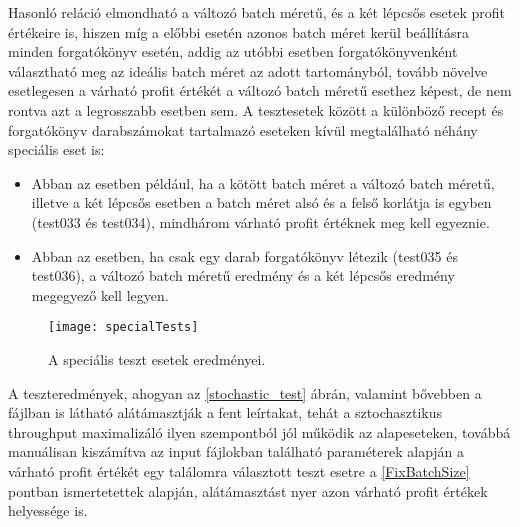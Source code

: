 Hasonló reláció elmondható a változó batch méretű, és a két lépcsős esetek profit értékeire is, hiszen míg a előbbi esetén azonos batch méret kerül beállításra minden forgatókönyv esetén, addig az utóbbi esetben forgatókönyvenként választható meg az ideális batch méret az adott tartományból, tovább növelve esetlegesen a várható profit értékét a változó batch méretű esethez képest, de nem rontva azt a legrosszabb esetben sem.
A tesztesetek között a különböző recept és forgatókönyv darabszámokat tartalmazó eseteken kívül megtalálható néhány speciális eset is:
\begin{itemize}
\item Abban az esetben például, ha a kötött batch méret a változó batch méretű, illetve a két lépcsős esetben a batch méret alsó és a felső korlátja is egyben (test033 és test034), mindhárom várható profit értéknek meg kell egyeznie.
\item Abban az esetben, ha csak egy darab forgatókönyv létezik (test035 és test036), a változó batch méretű eredmény és a két lépcsős eredmény megegyező kell legyen.
\end{itemize}
\begin{figure}[H]
\begin{center}
\texttt{[image: specialTests]}
\caption{A speciális teszt esetek eredményei.}
\label{special_tests}
\end{center}
\end{figure} 
A teszteredmények, ahogyan az \ref{stochastic_test} ábrán, valamint bővebben a  fájlban is látható alátámasztják a fent leírtakat, tehát a sztochasztikus throughput maximalizáló ilyen szempontból jól működik az alapeseteken, továbbá manuálisan kiszámítva az input fájlokban található paraméterek alapján a várható profit értékét egy találomra választott teszt esetre a \ref{FixBatchSize} pontban ismertetettek alapján, alátámasztást nyer azon várható profit értékek helyessége is.
\pagebreak
